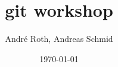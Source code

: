 \documentclass[t,8pt]{beamer}
\begin{document}
\title{git workshop}
\author{André Roth, Andreas Schmid}

\date{\today}

\frame{\titlepage}


\end{document}
